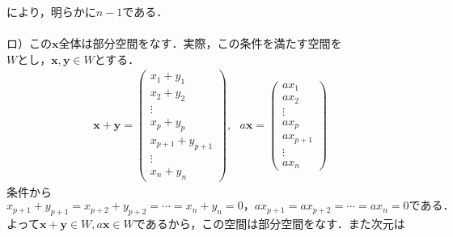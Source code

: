 \documentclass[dvipdfmx,uplatex,11pt]{jsarticle}
\theoremstyle{definition}
\begin{document}
により，明らかに$n-1$である．\\
\dotfill \\
ロ）この$\bm{x}全体は部分空間をなす．$実際，この条件を満たす空間を$Wとし，\bm{x,y} \in W$とする．
\begin{eqnarray*}
\bm{x}+\bm{y}=
\begin{pmatrix}
x_1+y_1 \\
x_2+y_2 \\
\vdots \\
x_{p}+y_{p} \\
x_{p+1}+y_{p+1} \\
\vdots \\
x_n+y_n
\end{pmatrix}
,~~~
a\bm{x}=
\begin{pmatrix}
ax_1 \\
ax_2 \\
\vdots \\
ax_{p} \\
ax_{p+1} \\
\vdots \\
ax_n
\end{pmatrix}
\end{eqnarray*}
条件から$x_{p+1}+y_{p+1}=x_{p+2}+y_{p+2}=\cdots =x_{n}+y_{n}=0，ax_{p+1}=ax_{p+2}=\cdots =ax_n=0である．$\\
よって$\bm{x}+\bm{y} \in W, a\bm{x} \in W$であるから，この空間は部分空間をなす．また次元は
\end{document}

